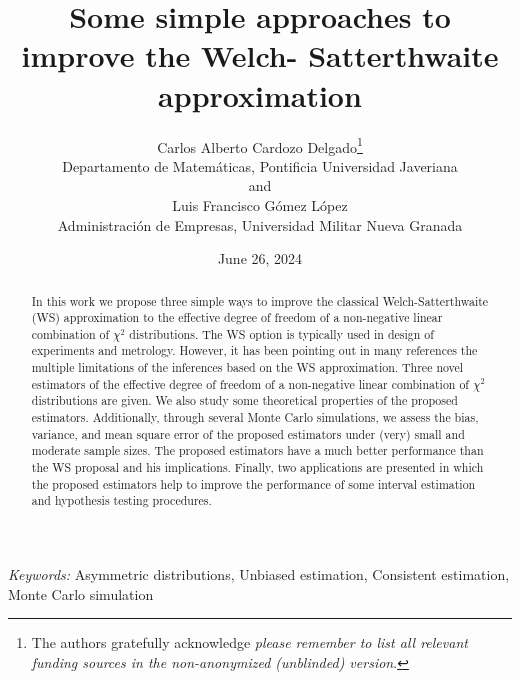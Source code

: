 \documentclass[
  12pt]{article}
\begin{document}
\def\spacingset#1{\renewcommand{\baselinestretch}%
{#1}\small\normalsize} \spacingset{1}



\date{June 26, 2024}
\title{\bf Some simple approaches to improve the Welch- Satterthwaite
approximation}
\author{
Carlos Alberto Cardozo Delgado\thanks{The authors gratefully acknowledge
\emph{please remember to list all relevant funding sources in the
non-anonymized (unblinded) version}.}\\
Departamento de Matemáticas, Pontificia Universidad Javeriana\\
and\\Luis Francisco Gómez López\\
Administración de Empresas, Universidad Militar Nueva Granada\\
}
\maketitle

\bigskip
\bigskip
\begin{abstract}
In this work we propose three simple ways to improve the classical
Welch-Satterthwaite (WS) approximation to the effective degree of
freedom of a non-negative linear combination of \(\chi^2\)
distributions. The WS option is typically used in design of experiments
and metrology. However, it has been pointing out in many references the
multiple limitations of the inferences based on the WS approximation.
Three novel estimators of the effective degree of freedom of a
non-negative linear combination of \(\chi^2\) distributions are given.
We also study some theoretical properties of the proposed estimators.
Additionally, through several Monte Carlo simulations, we assess the
bias, variance, and mean square error of the proposed estimators under
(very) small and moderate sample sizes. The proposed estimators have a
much better performance than the WS proposal and his implications.
Finally, two applications are presented in which the proposed estimators
help to improve the performance of some interval estimation and
hypothesis testing procedures.
\end{abstract}

\noindent%
{\it Keywords:} Asymmetric distributions, Unbiased
estimation, Consistent estimation, Monte Carlo simulation
\vfill

\newpage
\spacingset{1.9} %
\end{document}
